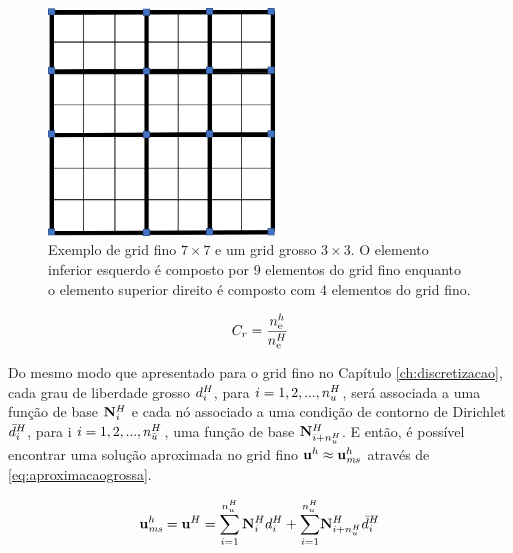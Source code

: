\begin{figure}[!htbp]
\centering
\includegraphics[width=6cm]{chap06/figs/grosso.png}
\caption{Exemplo de grid fino $7\times 7$ e um grid grosso $3\times 3$. O elemento inferior esquerdo é composto por 9 elementos do grid fino enquanto o elemento superior direito é composto com 4 elementos do grid fino.}
\label{fig:gridgrosso}
\end{figure}


\begin{equation} \label{eq:fatordeengrossamento}
    C_r = \frac{n_{\text{e}}^h}{n_{\text{e}}^H}
\end{equation}




Do mesmo modo que apresentado para o grid fino no Capítulo \ref{ch:discretizacao}, cada grau de liberdade grosso $d^H_{i}$, para $i=1, 2,..., n_u^H$, será associada a uma função de base $\mathbf{N}_{i}^H$ e cada nó associado a uma condição de contorno de Dirichlet $\bar{d}^H_{i}$, para i $i=1, 2,..., n_{\bar{u}}^H$,  uma função de base ${\mathbf{N}_{i+n_u^H}^H}$. E então, é possível encontrar uma solução aproximada no grid fino $\mathbf{u}^h \approx \mathbf{u}^h_{\textit{ms}}$ através de \eqref{eq:aproximacaogrossa}.

\begin{equation} \label{eq:aproximacaogrossa}
    \mathbf{u}^h_{\textit{ms}} = \mathbf{u}^H = \sum_{i=1}^{n_u^H} \mathbf{N}_{i}^H d^H_{i} + {\sum_{i=1}^ {n_u^H}}  {\mathbf{N}_{i+n_u^H}^H} \bar{d}^H_{i}
\end{equation}
 

